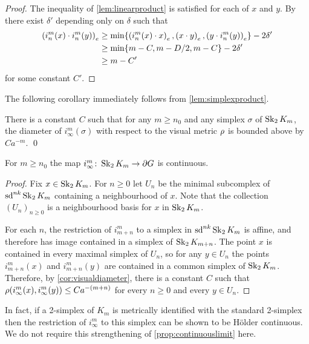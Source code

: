 \documentclass[a4paper]{article}
\begin{document}
\begin{proof}
  The inequality of \cref{lem:linearproduct} is satisfied for each of $x$ 
  and $y$. By~\cite[Proposition III.H.1.22]{bridsonhaefliger99} there exist
  $\delta'$ depending only on $\delta$ such that
  \begin{align*}
    \gromov{e}{i^m_n(x)}{i^m_n(y)} &\geq \min\{\gromov{e}{i^m_n(x)}{x}, 
    \gromov{e}{x}{y}, \gromov{e}{y}{i^m_n(y)}\} - 2\delta'\\
    &\geq \min\{m - C, m - D/2, m - C\} - 2\delta' \\
    &\geq m - C'
  \end{align*}
  for some constant $C'$.
\end{proof}

The following corollary immediately follows from \cref{lem:simplexproduct}.

\begin{corollary}\label{cor:visualdiameter}
  There is a constant $C$ such that for any $m\geq n_0$ and any simplex
  $\sigma$ of $\Skel_2 K_m$, the diameter of $i^m_{\infty}(\sigma)$ with
  respect to the visual metric $\vdistance$ is bounded above by $Ca^{-m}$.
  \qed
\end{corollary}

\begin{proposition}\label{prop:continuouslimit}
  For $m\geq n_0$ the map $i^m_\infty\from \Skel_2 K_m \to \boundary G$ is
  continuous.
\end{proposition}

\begin{proof}
  Fix $x \in \Skel_2 K_m$. For $n\geq 0$ let $U_n$ be the minimal subcomplex of
  $\sd^{nk}\Skel_2 K_m$ containing a neighbourhood of $x$. Note that the
  collection $(U_n)_{n \geq 0}$ is a neighbourhood basis for $x$ in $\Skel_2
  K_m$.

  For each $n$, the restriction of $i^m_{m+n}$ to a simplex in 
  $\sd^{nk}\Skel_2K_m$ is affine, and therefore has image contained in a 
  simplex of $\Skel_2 K_{m+n}$. The point $x$ is contained in every maximal simplex 
  of $U_n$, so for any $y \in U_n$ the points $i^m_{m+n}(x)$ and $i^m_{m+n}(y)$ 
  are contained in a common simplex of $\Skel_2K_m$. Therefore, by 
  \cref{cor:visualdiameter}, there is a constant $C$ such that 
  $\vdistance(i^m_\infty(x), i^m_\infty(y)) \leq Ca^{-(m+n)}$ for every $n \geq
  0$ and every $y \in U_n$.
\end{proof}

\begin{remark}
  In fact, if a 2-simplex of $K_m$ is metrically identified with the standard
  2-simplex then the restriction of $i^m_\infty$ to this simplex can be shown
  to be H\"{o}lder continuous.  We do not require this strengthening of
  \cref{prop:continuouslimit} here.
\end{remark}
\end{document}
